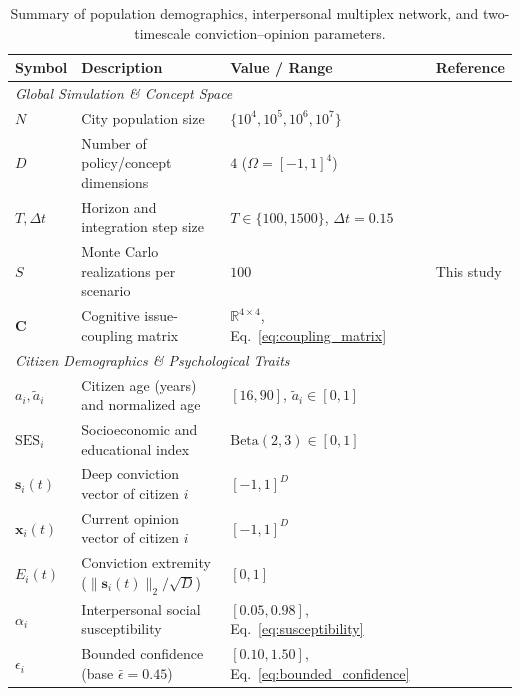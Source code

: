 \documentclass[11pt,a4paper]{article}
\begin{document}
\begin{table}[htbp]
\centering
\caption{Summary of population demographics, interpersonal multiplex network, and two-timescale conviction--opinion parameters.}
\label{tab:supp_model_parameters}
\footnotesize
\setlength{\tabcolsep}{4.5pt}
\begin{tabular}{lp{5.1cm}p{3.6cm}p{3.8cm}}
\toprule
\textbf{Symbol} & \textbf{Description} & \textbf{Value / Range} & \textbf{Reference} \\
\midrule
\multicolumn{4}{l}{\textit{Global Simulation \& Concept Space}} \\
$N$ & City population size & $\{10^4, 10^5, 10^6, 10^7\}$ & \cite{bettencourt2007growth} \\
$D$ & Number of policy/concept dimensions & $4$ ($\Omega = [-1, 1]^4$) & \cite{converse1964nature} \\
$T, \Delta t$ & Horizon and integration step size & $T \in \{100, 1500\}$, $\Delta t = 0.15$ & \cite{friedkin1990social} \\
$S$ & Monte Carlo realizations per scenario & $100$ & This study \\
$\mathbf{C}$ & Cognitive issue-coupling matrix & $\mathbb{R}^{4 \times 4}$, Eq.~\eqref{eq:coupling_matrix} & \cite{friedkin2016network} \\
\midrule
\multicolumn{4}{l}{\textit{Citizen Demographics \& Psychological Traits}} \\
$a_i, \tilde{a}_i$ & Citizen age (years) and normalized age & $[16, 90]$, $\tilde{a}_i \in [0, 1]$ & \cite{ibge2022censo} \\
$\mathrm{SES}_i$ & Socioeconomic and educational index & $\mathrm{Beta}(2, 3) \in [0, 1]$ & \cite{ibge2022censo} \\
$\mathbf{s}_i(t)$ & Deep conviction vector of citizen $i$ & $[-1, 1]^D$ & \cite{converse1964nature, kiley2020measuring} \\
$\mathbf{x}_i(t)$ & Current opinion vector of citizen $i$ & $[-1, 1]^D$ & \cite{zaller1992nature} \\
$E_i(t)$ & Conviction extremity ($\|\mathbf{s}_i(t)\|_2 / \sqrt{D}$) & $[0, 1]$ & \cite{howe2017attitude} \\
$\alpha_i$ & Interpersonal social susceptibility & $[0.05, 0.98]$, Eq.~\eqref{eq:susceptibility} & \cite{friedkin1990social, alwin1991aging} \\
$\epsilon_i$ & Bounded confidence (base $\bar{\epsilon}=0.45$) & $[0.10, 1.50]$, Eq.~\eqref{eq:bounded_confidence} & \cite{deffuant2000mixing, hegselmann2002opinion} \\

\end{tabular}
\end{table}
\end{document}
